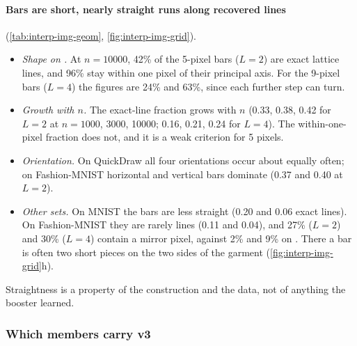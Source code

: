 \paragraph{Bars are short, nearly straight runs along recovered lines}  (\cref{tab:interp-img-geom}, \cref{fig:interp-img-grid}).
\begin{itemize}
\item \emph{Shape on .} At $n=10000$, 42\% of the 5-pixel bars ($L=2$) are exact lattice lines, and 96\% stay within one pixel of their principal axis. For the 9-pixel bars ($L=4$) the figures are 24\% and 63\%, since each further step can turn.
\item \emph{Growth with $n$.} The exact-line fraction grows with $n$ (0.33, 0.38, 0.42 for $L=2$ at $n=1000$, 3000, 10000; 0.16, 0.21, 0.24 for $L=4$). The within-one-pixel fraction does not, and it is a weak criterion for 5 pixels.
\item \emph{Orientation.} On QuickDraw all four orientations occur about equally often; on Fashion-MNIST horizontal and vertical bars dominate (0.37 and 0.40 at $L=2$).
\item \emph{Other sets.} On MNIST the bars are less straight (0.20 and 0.06 exact lines). On Fashion-MNIST they are rarely lines (0.11 and 0.04), and 27\% ($L=2$) and 30\% ($L=4$) contain a mirror pixel, against 2\% and 9\% on . There a bar is often two short pieces on the two sides of the garment (\cref{fig:interp-img-grid}h).
\end{itemize}
Straightness is a property of the construction and the data, not of anything the booster learned.

\subsubsection{Which members carry v3}\label{sec:interp-img-members}

\begin{table}[tbp]
\centering{\footnotesize\setlength{\tabcolsep}{3.2pt}
}
\caption{Which members carry v3 on images (seed 0, one fit each) . Left: each member family's share of the total stacking weight. : $k$-NN votes on pooled sums; : $k$-NN votes on pixels; , , : Part 8's LightGBM, ExtraTrees and logistic regression on pixels. Middle: out-of-fold error of the two boosters (5-fold at $n\le3000$; one holdout of 2000 rows at $n=10000$). Right: test error of the stacked learner (v3; v2 in the last row) and of each booster alone (its own argmax). $^a$ had stacking weight 0, so the booster shown is its out-of-fold fit on 8000 () or 7998 (MNIST) rows; only the out-of-fold comparison is like for like there. Last row: v2's analysis fit. The weights are not shares of the decision (see the cautions in the text). Source: the analysis files in .}
\label{tab:interp-img-stack}
\end{table}

